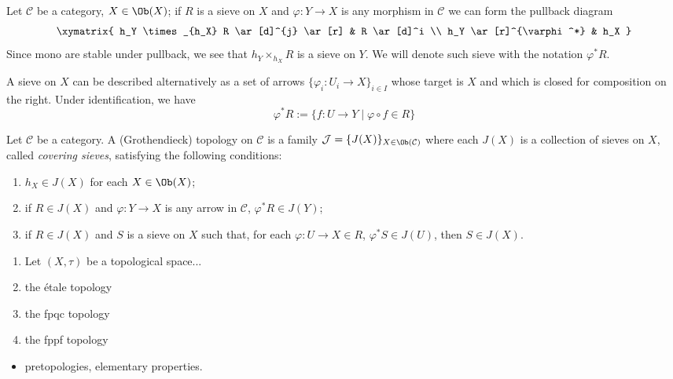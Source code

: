 \begin{notation}
Let $\mathcal C$ be a category, $X \in \Ob(X)$; if $R$ is a sieve on $X$ and $\varphi \colon Y \to X$ is any morphism in $\mathcal C$ we can form the pullback diagram
\[
\xymatrix{
h_Y \times_{h_X} R \ar[d]^{j} \ar[r] & R \ar[d]^i \\ h_Y \ar[r]^{\varphi^*} & h_X
}
\]
Since mono are stable under pullback, we see that $h_Y \times_{h_X} R$ is a sieve on $Y$. We will denote such sieve with the notation $\varphi^* R$.
\end{notation}

\begin{rmk}
A sieve on $X$ can be described alternatively as a set of arrows $\{\varphi_i \colon U_i \to X \}_{i \in I}$ whose target is $X$ and which is closed for composition on the right. Under identification, we have
\[
\varphi^* R := \{f \colon U \to Y \mid \varphi \circ f \in R\}
\]
\end{rmk}

\begin{defin}
Let $\mathcal C$ be a category. A (Grothendieck) topology on $\mathcal C$ is a family $\mathcal J = \{J(X)\}_{X \in \Ob(\mathcal C)}$ where each $J(X)$ is a collection of sieves on $X$, called \emph{covering sieves}, satisfying the following conditions:
\begin{enumerate}
\item $h_X \in J(X)$ for each $X \in \Ob(X)$;
\item if $R \in J(X)$ and $\varphi \colon Y \to X$ is any arrow in $\mathcal C$, $\varphi^* R \in J(Y)$;
\item if $R \in J(X)$ and $S$ is a sieve on $X$ such that, for each $\varphi \colon U \to X \in R$, $\varphi^* S \in J(U)$, then $S \in J(X)$.
\end{enumerate}
\end{defin}

\begin{eg}
\begin{enumerate}
\item Let $(X,\tau)$ be a topological space...
\item the étale topology
\item the fpqc topology
\item the fppf topology
\end{enumerate}
\end{eg}

\begin{itemize}
\item pretopologies, elementary properties.
\end{itemize}

